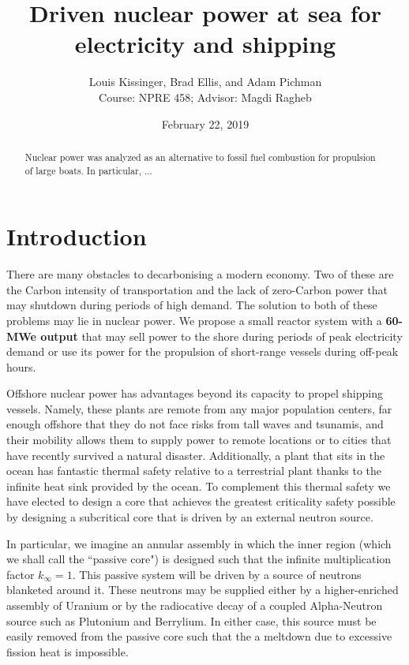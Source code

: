 \documentclass[12pt]{article}
\title{Driven nuclear power at sea for electricity and shipping}
\author{Louis Kissinger, Brad Ellis, and Adam Pichman \\Course: NPRE 458; Advisor: Magdi Ragheb}
\date{February 22, 2019}
\begin{document}
\maketitle
%
\pagebreak
\begin{abstract}
Nuclear power was analyzed as an alternative to fossil fuel combustion for propulsion of large boats. In particular, ... 
\end{abstract} 

\pagebreak
\tableofcontents


\section{Introduction}
There are many obstacles to decarbonising a modern economy. Two of these are the Carbon intensity of transportation and the lack of zero-Carbon power that may shutdown during periods of high demand. The solution to both of these problems may lie in nuclear power. We propose a small reactor system with a \textbf{60-MWe output} that may sell power to the shore during periods of peak electricity demand or use its power for the propulsion of short-range vessels during off-peak hours. 

Offshore nuclear power has advantages beyond its capacity to propel shipping vessels. Namely, these plants are remote from any major population centers, far enough offshore that they do not face risks from tall waves and tsunamis, and their mobility allows them to supply power to remote locations or to cities that have recently survived a natural disaster. Additionally, a plant that sits in the ocean has fantastic thermal safety relative to a terrestrial plant thanks to the infinite heat sink provided by the ocean. To complement this thermal safety we have elected to design a core that achieves the greatest criticality safety possible by designing a subcritical core that is driven by an external neutron source. 

In particular, we imagine an annular assembly in which the inner region (which we shall call the ``passive core") is designed such that the infinite multiplication factor $k_\infty = 1$. This passive system will be driven by a source of neutrons blanketed around it. These neutrons may be supplied either by a higher-enriched assembly of Uranium or by the radiocative decay of a coupled Alpha-Neutron source such as Plutonium and Berrylium. In either case, this source must be easily removed from the passive core such that the a meltdown due to excessive fission heat is impossible.
\end{document}
